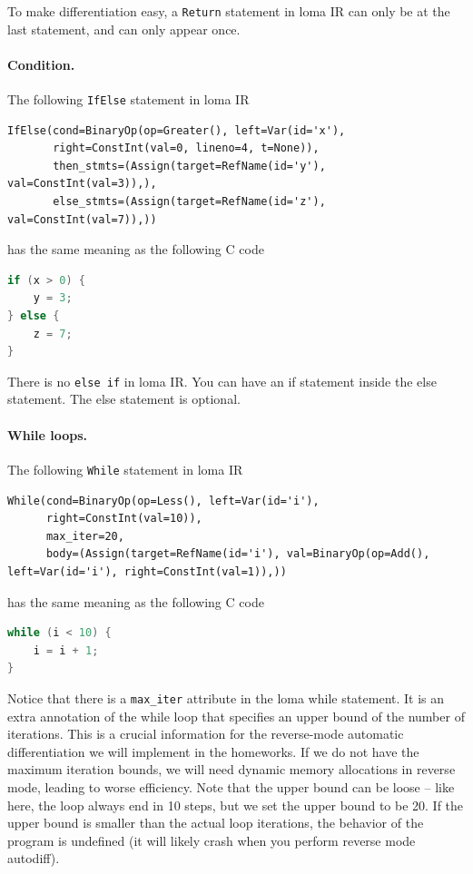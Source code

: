 To make differentiation easy, a \lstinline{Return} statement in loma IR can only be at the last statement, and can only appear once. 

\paragraph{Condition.}
The following \lstinline{IfElse} statement in loma IR
\begin{lstlisting}
IfElse(cond=BinaryOp(op=Greater(), left=Var(id='x'),
       right=ConstInt(val=0, lineno=4, t=None)),
       then_stmts=(Assign(target=RefName(id='y'), val=ConstInt(val=3)),),
       else_stmts=(Assign(target=RefName(id='z'), val=ConstInt(val=7)),))
\end{lstlisting}
has the same meaning as the following C code
\begin{lstlisting}[language=c]
if (x > 0) {
    y = 3;
} else {
    z = 7;
}
\end{lstlisting}

There is no \lstinline{else if} in loma IR. You can have an if statement inside the else statement. The else statement is optional.

\paragraph{While loops.}
The following \lstinline{While} statement in loma IR
\begin{lstlisting}
While(cond=BinaryOp(op=Less(), left=Var(id='i'),
      right=ConstInt(val=10)),
      max_iter=20,
      body=(Assign(target=RefName(id='i'), val=BinaryOp(op=Add(), left=Var(id='i'), right=ConstInt(val=1)),))
\end{lstlisting}
has the same meaning as the following C code
\begin{lstlisting}[language=c]
while (i < 10) {
    i = i + 1;
}
\end{lstlisting}
Notice that there is a \lstinline{max_iter} attribute in the loma while statement. It is an extra annotation of the while loop that specifies an upper bound of the number of iterations. This is a crucial information for the reverse-mode automatic differentiation we will implement in the homeworks. If we do not have the maximum iteration bounds, we will need dynamic memory allocations in reverse mode, leading to worse efficiency. Note that the upper bound can be loose -- like here, the loop always end in 10 steps, but we set the upper bound to be 20. If the upper bound is smaller than the actual loop iterations, the behavior of the program is undefined (it will likely crash when you perform reverse mode autodiff).

